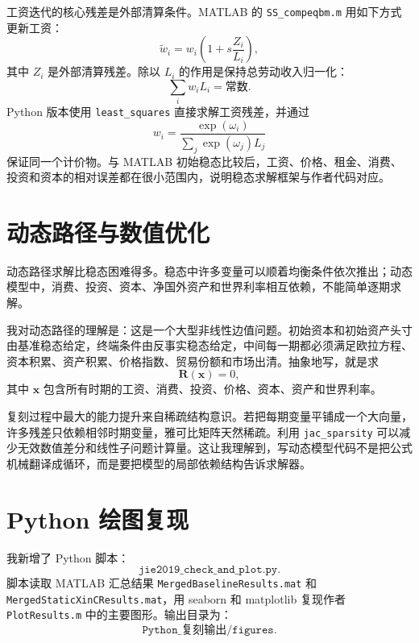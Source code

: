 \documentclass[UTF8,12pt,a4paper]{ctexart}
\begin{document}
工资迭代的核心残差是外部清算条件。MATLAB 的 \texttt{SS\_compeqbm.m} 用如下方式更新工资：
\begin{equation}
\tilde{w}_i=w_i\left(1+s\frac{Z_i}{L_i}\right),
\end{equation}
其中 $Z_i$ 是外部清算残差。除以 $L_i$ 的作用是保持总劳动收入归一化：
\begin{equation}
\sum_i w_iL_i=\text{常数}.
\end{equation}
Python 版本使用 \texttt{least\_squares} 直接求解工资残差，并通过
\[
w_i=\frac{\exp(\omega_i)}{\sum_j \exp(\omega_j)L_j}
\]
保证同一个计价物。与 MATLAB 初始稳态比较后，工资、价格、租金、消费、投资和资本的相对误差都在很小范围内，说明稳态求解框架与作者代码对应。

\section{动态路径与数值优化}

动态路径求解比稳态困难得多。稳态中许多变量可以顺着均衡条件依次推出；动态模型中，消费、投资、资本、净国外资产和世界利率相互依赖，不能简单逐期求解。

我对动态路径的理解是：这是一个大型非线性边值问题。初始资本和初始资产头寸由基准稳态给定，终端条件由反事实稳态给定，中间每一期都必须满足欧拉方程、资本积累、资产积累、价格指数、贸易份额和市场出清。抽象地写，就是求
\begin{equation}
\bm R(\bm x)=0,
\end{equation}
其中 $\bm x$ 包含所有时期的工资、消费、投资、价格、资本、资产和世界利率。

复刻过程中最大的能力提升来自稀疏结构意识。若把每期变量平铺成一个大向量，许多残差只依赖相邻时期变量，雅可比矩阵天然稀疏。利用 \texttt{jac\_sparsity} 可以减少无效数值差分和线性子问题计算量。这让我理解到，写动态模型代码不是把公式机械翻译成循环，而是要把模型的局部依赖结构告诉求解器。

\section{Python 绘图复现}

我新增了 Python 脚本：
\[
\texttt{jie2019\_check\_and\_plot.py}.
\]
脚本读取 MATLAB 汇总结果 \texttt{MergedBaselineResults.mat} 和 \texttt{MergedStaticXinCResults.mat}，用 seaborn 和 matplotlib 复现作者 \texttt{PlotResults.m} 中的主要图形。输出目录为：
\[
\texttt{Python\_复刻输出/figures}.
\]
\end{document}
